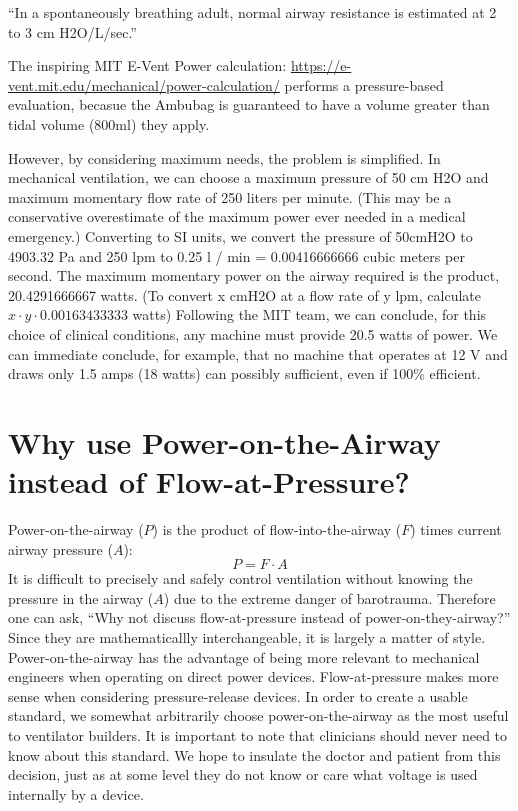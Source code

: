 \documentclass{article}
\begin{document}
``In a spontaneously breathing adult, normal airway resistance is estimated at 2 to 3
cm H2O/L/sec.''

The inspiring MIT E-Vent Power calculation: \url{https://e-vent.mit.edu/mechanical/power-calculation/} performs
a pressure-based evaluation, becasue the Ambubag is guaranteed to have a volume greater than tidal volume (800ml) they apply.

However, by considering maximum needs, the problem is simplified. In mechanical ventilation,
we can choose a maximum pressure of 50 cm H2O and maximum momentary flow rate of 250 liters per minute.
(This may be a conservative overestimate of the maximum power ever needed in a medical emergency.)
Converting to SI units, we convert the pressure of 50cmH2O to 4903.32 Pa and 250 lpm to 0.25 l / min = 0.00416666666 cubic meters per second.
The maximum momentary power on the airway required is the product, 20.4291666667 watts.
(To convert x cmH2O at a flow rate of y lpm, calculate $x \cdot y \cdot 0.00163433333$ watts)
Following the MIT team, we can conclude, for this choice of clinical conditions, any
machine must provide 20.5 watts of power. We can immediate conclude, for example, that no machine
that operates at 12 V and draws only 1.5 amps (18 watts) can possibly sufficient, even if 100\% efficient.

\section{Why use Power-on-the-Airway instead of Flow-at-Pressure?}

Power-on-the-airway ($P$) is the product of flow-into-the-airway ($F$) times
current airway pressure ($A$):
\begin{equation}
  P = F \cdot A
\end{equation}
It is difficult to precisely and safely control ventilation without knowing the
pressure in the airway ($A$) due to the extreme danger of barotrauma.
Therefore one can ask,
``Why not discuss flow-at-pressure instead
of power-on-they-airway?''
Since they are mathematicallly interchangeable, it is
largely a matter of style. Power-on-the-airway has the advantage of being
more relevant to mechanical engineers when operating on direct power devices.
Flow-at-pressure makes more sense when considering pressure-release devices.
In order to create a usable standard, we somewhat arbitrarily choose power-on-the-airway
as the most useful to ventilator builders. It is important to note that clinicians
should never need to know about this standard. We hope to insulate the doctor and
patient from this decision, just as at some level they do not know or care what voltage
is used internally by a device.
\end{document}
